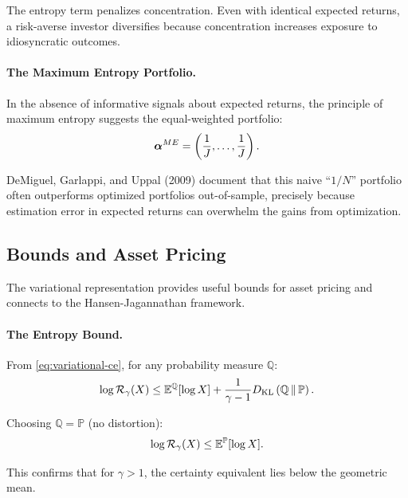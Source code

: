 The entropy term penalizes concentration. Even with identical expected returns, a risk-averse investor diversifies because concentration increases exposure to idiosyncratic outcomes.

\paragraph{The Maximum Entropy Portfolio.}

In the absence of informative signals about expected returns, the principle of maximum entropy suggests the equal-weighted portfolio:
\begin{equation}
\boldsymbol{\alpha}^{ME} = \left( \frac{1}{J}, \ldots, \frac{1}{J} \right).
\label{eq:max-entropy-portfolio}
\end{equation}

DeMiguel, Garlappi, and Uppal (2009) document that this naive ``$1/N$'' portfolio often outperforms optimized portfolios out-of-sample, precisely because estimation error in expected returns can overwhelm the gains from optimization.

\subsection{Bounds and Asset Pricing}
\label{subsec:bounds-asset-pricing}

The variational representation provides useful bounds for asset pricing and connects to the Hansen-Jagannathan framework.

\paragraph{The Entropy Bound.}

From \eqref{eq:variational-ce}, for any probability measure $\mathbb{Q}$:
\begin{equation}
\log \mathcal{R}_{\gamma}(X) \leq \mathbb{E}^{\mathbb{Q}}[\log X] + \frac{1}{\gamma - 1} D_{\mathrm{KL}}\left(\mathbb{Q} \,\|\, \mathbb{P}\right).
\label{eq:entropy-bound}
\end{equation}

Choosing $\mathbb{Q} = \mathbb{P}$ (no distortion):
\begin{equation}
\log \mathcal{R}_{\gamma}(X) \leq \mathbb{E}^{\mathbb{P}}[\log X].
\label{eq:ce-log-bound}
\end{equation}

This confirms that for $\gamma > 1$, the certainty equivalent lies below the geometric mean.

